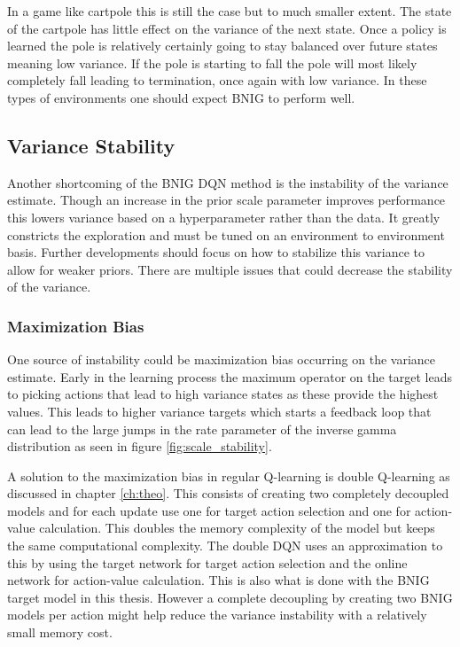 In a game like cartpole this is still the case but to much smaller extent. The state of the cartpole has little effect on the variance of the next state. Once a policy is learned the pole is relatively certainly going to stay balanced over future states meaning low variance. If the pole is starting to fall the pole will most likely completely fall leading to termination, once again with low variance. In these types of environments one should expect BNIG to perform well.

\subsection{Variance Stability}

Another shortcoming of the BNIG DQN method is the instability of the variance estimate. Though an increase in the prior scale parameter improves performance this lowers variance based on a hyperparameter rather than the data. It greatly constricts the exploration and must be tuned on an environment to environment basis. Further developments should focus on how to stabilize this variance to allow for weaker priors. There are multiple issues that could decrease the stability of the variance.


\subsubsection{Maximization Bias}

One source of instability could be maximization bias\citep[p.~134]{sutton_barto_2018} occurring on the variance estimate. Early in the learning process the maximum operator on the target leads to picking actions that lead to high variance states as these provide the highest values. This leads to higher variance targets which starts a feedback loop that can lead to the large jumps in the rate parameter of the inverse gamma distribution as seen in figure \ref{fig:scale_stability}.

A solution to the maximization bias in regular Q-learning is double Q-learning as discussed in chapter \ref{ch:theo}. This consists of creating two completely decoupled models and for each update use one for target action selection and one for action-value calculation. This doubles the memory complexity of the model but keeps the same computational complexity. The double DQN uses an approximation to this by using the target network for target action selection and the online network for action-value calculation. This is also what is done with the BNIG target model in this thesis. However a complete decoupling by creating two BNIG models per action might help reduce the variance instability with a relatively small memory cost.

